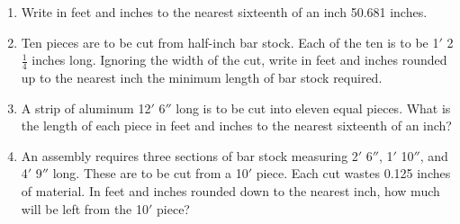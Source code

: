 \documentclass[12pt,fleqn]{article} %
\begin{document}
\begin{enumerate}
  \item Write in feet and inches to the nearest sixteenth of an inch 50.681 inches. 
  \spacing

  \item Ten pieces are to be cut from half-inch bar stock. Each of the ten is to be 1$'$ 2$\frac{1}{4}$ inches long. Ignoring the width of the cut, write in feet and inches rounded up to the nearest inch the minimum length of bar stock required. 
  \spacing

  \item A strip of aluminum 12$'$ 6$''$ long is to be cut into eleven equal pieces. What is the length of each piece in feet and inches to the nearest sixteenth of an inch? 
  \spacing

  \item An assembly requires three sections of bar stock measuring 2$'$ 6$''$, 1$'$ 10$''$, and 4$'$ 9$''$ long. These are to be cut from a 10$'$ piece. Each cut wastes 0.125 inches of material. In feet and inches rounded down to the nearest inch, how much will be left from the 10$'$ piece? 
  \spacing

\end{enumerate}
\end{document}
